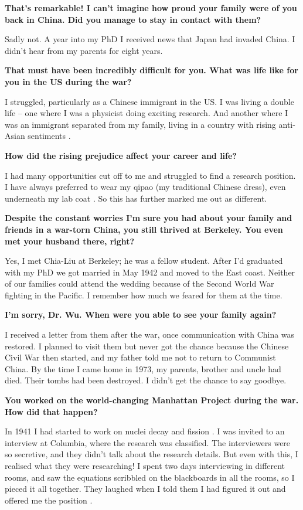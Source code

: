\documentclass{article}
\newcommand{\q}[1]{\vspace{10pt}
\textbf{#1}
\vspace{0pt}}
\begin{document}
\begin{multicols}{2}
\q{That’s remarkable! I can’t imagine how proud your family were of you back in China. Did you manage to stay in contact with them?}

Sadly not. A year into my PhD I received news that Japan had invaded China. I didn’t hear from my parents for eight years.

\q{That must have been incredibly difficult for you. What was life like for you in the US during the war?}

I struggled, particularly as a Chinese immigrant in the US. I was living a double life – one where I was a physicist doing exciting research. And another where I was an immigrant separated from my family, living in a country with rising anti-Asian sentiments \cite{N2}.

\q{How did the rising prejudice affect your career and life?}

I had many opportunities cut off to me and struggled to find a research position. I have always preferred to wear my qipao (my traditional Chinese dress), even underneath my lab coat \cite{N3}. So this has further marked me out as different.

\q{Despite the constant worries I’m sure you had about your family and friends in a war-torn China, you still thrived at Berkeley. You even met your husband there, right?}

Yes, I met Chia-Liu at Berkeley; he was a fellow student. After I’d graduated with my PhD we got married in May 1942 and moved to the East coast. \cite{L9} Neither of our families could attend the wedding because of the Second World War fighting in the Pacific. I remember how much we feared for them at the time.

\q{I’m sorry, Dr. Wu. When were you able to see your family again?}

I received a letter from them after the war, once communication with China was restored. I planned to visit them but never got the chance because the Chinese Civil War then started, and my father told me not to return to Communist China. By the time I came home in 1973, my parents, brother and uncle had died. Their tombs had been destroyed. I didn't get the chance to say goodbye.

\q{You worked on the world-changing Manhattan Project during the war. How did that happen?}

In 1941 I had started to work on nuclei decay and fission \cite{N4}. I was invited to an interview at Columbia, where the research was classified. The interviewers were so secretive, and they didn’t talk about the research details. But even with this, I realised what they were researching! I spent two days interviewing in different rooms, and saw the equations scribbled on the blackboards in all the rooms, so I pieced it all together. They laughed when I told them I had figured it out and offered me the position \cite{N4}.


\end{multicols}
\end{document}
